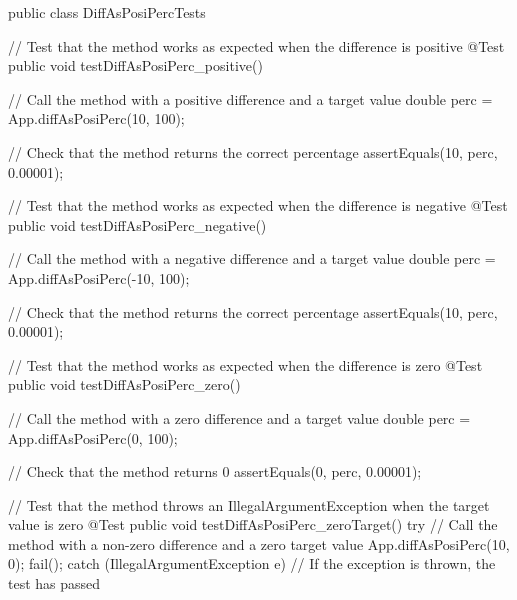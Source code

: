 \documentclass[a4paper]{article}
\begin{document}
 \hspace{-1.7cm}\begin{verbbox}[]
 public class DiffAsPosiPercTests {
  // Test that the method works as expected when the difference is positive
  @Test
  public void testDiffAsPosiPerc_positive() {
    // Call the method with a positive difference and a target value
    double perc = App.diffAsPosiPerc(10, 100);

    // Check that the method returns the correct percentage
    assertEquals(10, perc, 0.00001);
  }

  // Test that the method works as expected when the difference is negative
  @Test
  public void testDiffAsPosiPerc_negative() {
    // Call the method with a negative difference and a target value
    double perc = App.diffAsPosiPerc(-10, 100);

    // Check that the method returns the correct percentage
    assertEquals(10, perc, 0.00001);
  }

  // Test that the method works as expected when the difference is zero
  @Test
  public void testDiffAsPosiPerc_zero() {
    // Call the method with a zero difference and a target value
    double perc = App.diffAsPosiPerc(0, 100);

    // Check that the method returns 0
    assertEquals(0, perc, 0.00001);
  }

  // Test that the method throws an IllegalArgumentException when the target value is zero
  @Test
  public void testDiffAsPosiPerc_zeroTarget() {
    try {
      // Call the method with a non-zero difference and a zero target value
      App.diffAsPosiPerc(10, 0);
      fail();
    } catch (IllegalArgumentException e) {
      // If the exception is thrown, the test has passed
    }
  }
}
   \end{verbbox}
   \theverbbox
\newpage
\end{document}
